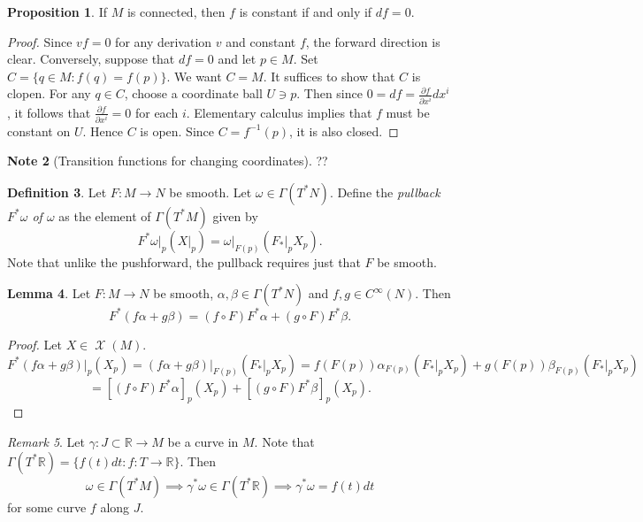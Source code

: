 \documentclass[10pt,letterpaper,cm]{nupset}
\theoremstyle{definition}
\newtheorem{definition}{Definition}[subsection]
\newtheorem{note}[definition]{Note}
\theoremstyle{theorem}
\newtheorem{lemma}[definition]{Lemma}
\newtheorem{prop}[definition]{Proposition}
\theoremstyle{remark}
\newtheorem{remark}[definition]{Remark}
\newcommand{\R}{\mathbb R}
\newcommand{\1}{\mathbf{1}}
\newcommand{\0}{\vec 0}
\DeclareMathOperator{\vf}{\mathscr{X}}
\begin{document}
\begin{prop}
If $M$ is connected, then $f$ is constant if and only if $df = 0$. 
\end{prop}
\begin{proof}
Since $vf = 0$ for any derivation $v$ and constant $f$, the forward direction is clear. Conversely, suppose that $df = 0$ and let $p\in M$. Set $C = \{q \in M : f(q) = f(p)\}$. We want $C = M$. It suffices to show that $C$ is clopen. For any $q\in C$, choose a coordinate ball $U\ni p$. Then since $0 = df = \frac{\partial{f}}{\partial{x^i}}dx^i$, it follows that $\frac{\partial{f}}{\partial{x^i}} = 0$ for each $i$. Elementary calculus implies that $f$ must be constant on $U$. Hence $C$ is open. Since $C = f^{-1}(p)$, it is also closed.
\end{proof}

\begin{note}[Transition functions for changing coordinates]
??
\end{note}

\begin{definition}
Let $F: M \to N$ be smooth. Let $\omega \in \Gamma(T^{\ast}N)$. Define the \textit{pullback $F^{\ast}\omega$ of $\omega$}  as the  element of $\Gamma(T^{\ast}M)$ given by $$F^{\ast}\omega \rvert_p (X \rvert_p) = \omega \rvert_{F(p)}(F_{\ast}\rvert_p X_p).$$ Note that unlike the pushforward, the pullback requires just that $F$ be smooth. 
\end{definition}

\begin{lemma}
Let $F: M \to N$ be smooth, $\alpha, \beta \in \Gamma(T^{\ast} N)$ and $f, g \in C^{\infty}(N)$. Then $$F^{\ast}(f \alpha + g \beta) = (f \circ F)F^{\ast} \alpha + (g \circ F)F^{\ast} \beta.$$
\end{lemma}
\begin{proof}
Let $X \in \vf(M)$. $$F^{\ast}(f \alpha + g\beta)\rvert_p(X_p) = (f \alpha + g \beta)\rvert_{F(p)}(F_{\ast}\rvert_p X_p) = 
f(F(p))\alpha_{F(p)}(F_{\ast}\rvert_p  X_p)+ g(F(p))\beta_{F(p)}(F_{\ast}\rvert_p X_p)$$
$$  = [(f\circ F)F^{\ast}\alpha]_p (X_p) + [(g\circ F) F^{\ast}\beta]_p(X_p).
$$
\end{proof}

\begin{remark}
Let $\gamma : J \subset \R \to M$ be a curve in $M$.  Note that $\Gamma(T^{\ast}\R) = \{f(t)dt : f : T \to \R\}$. Then
$$ \omega \in \Gamma(T^{\ast}M) \implies \gamma^{\ast} \omega \in \Gamma(T^{\ast}\R) \implies \gamma^{\ast}\omega = f(t)dt$$ for some curve $f$ along $J$.
\end{remark}
\end{document}
